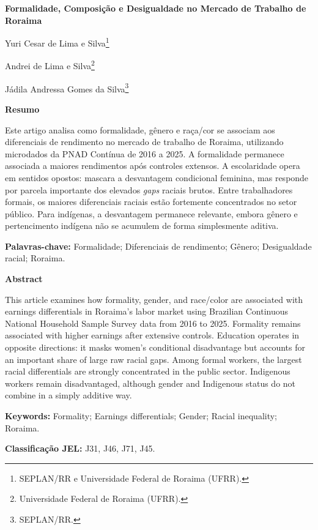 \documentclass[12pt,a4paper]{article}
\begin{document}
\thispagestyle{empty}

\begin{center}
{\large\bfseries Formalidade, Composição e Desigualdade no Mercado de Trabalho de Roraima\par}

\vspace{0.8cm}
\begin{singlespace}
Yuri Cesar de Lima e Silva\footnote{SEPLAN/RR e Universidade Federal de Roraima (UFRR).}\par
Andrei de Lima e Silva\footnote{Universidade Federal de Roraima (UFRR).}\par
Jádila Andressa Gomes da Silva\footnote{SEPLAN/RR.}
\end{singlespace}
\end{center}

\vspace{0.4cm}

\begin{singlespace}
\noindent\textbf{Resumo}

\noindent Este artigo analisa como formalidade, gênero e raça/cor se associam aos
diferenciais de rendimento no mercado de trabalho de Roraima, utilizando
microdados da PNAD Contínua de 2016 a 2025. A formalidade permanece associada
a maiores rendimentos após controles extensos. A escolaridade opera em sentidos
opostos: mascara a desvantagem condicional feminina, mas responde por parcela
importante dos elevados \textit{gaps} raciais brutos. Entre trabalhadores formais, os
maiores diferenciais raciais estão fortemente concentrados no setor público.
Para indígenas, a desvantagem permanece relevante, embora gênero e pertencimento
indígena não se acumulem de forma simplesmente aditiva.

\medskip
\noindent\textbf{Palavras-chave:} Formalidade; Diferenciais de rendimento;
Gênero; Desigualdade racial; Roraima.

\bigskip
\noindent\textbf{Abstract}

\noindent This article examines how formality, gender, and race/color are associated
with earnings differentials in Roraima's labor market using Brazilian
Continuous National Household Sample Survey data from 2016 to 2025.
Formality remains associated with higher earnings after extensive controls.
Education operates in opposite directions: it masks women's conditional
disadvantage but accounts for an important share of large raw racial gaps.
Among formal workers, the largest racial differentials are strongly
concentrated in the public sector. Indigenous workers remain disadvantaged,
although gender and Indigenous status do not combine in a simply additive way.

\medskip
\noindent\textbf{Keywords:} Formality; Earnings differentials; Gender; Racial inequality;
Roraima.

\bigskip
\noindent\textbf{Classificação JEL:} J31, J46, J71, J45.
\end{singlespace}
\end{document}
